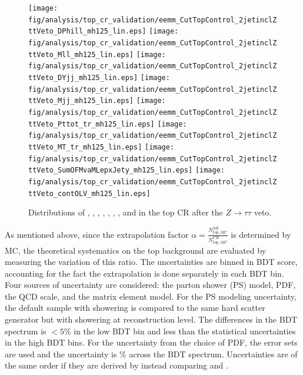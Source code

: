 \begin{figure}[h]
  \centering
  \texttt{[image: fig/analysis/top\_cr\_validation/eemm\_CutTopControl\_2jetinclZttVeto\_DPhill\_mh125\_lin.eps]}
   \texttt{[image: fig/analysis/top\_cr\_validation/eemm\_CutTopControl\_2jetinclZttVeto\_Mll\_mh125\_lin.eps]}
   \texttt{[image: fig/analysis/top\_cr\_validation/eemm\_CutTopControl\_2jetinclZttVeto\_DYjj\_mh125\_lin.eps]}
   \texttt{[image: fig/analysis/top\_cr\_validation/eemm\_CutTopControl\_2jetinclZttVeto\_Mjj\_mh125\_lin.eps]}
   \texttt{[image: fig/analysis/top\_cr\_validation/eemm\_CutTopControl\_2jetinclZttVeto\_Pttot\_tr\_mh125\_lin.eps]}
   \texttt{[image: fig/analysis/top\_cr\_validation/eemm\_CutTopControl\_2jetinclZttVeto\_MT\_tr\_mh125\_lin.eps]}
   \texttt{[image: fig/analysis/top\_cr\_validation/eemm\_CutTopControl\_2jetinclZttVeto\_SumOFMvaMLepxJety\_mh125\_lin.eps]}
   \texttt{[image: fig/analysis/top\_cr\_validation/eemm\_CutTopControl\_2jetinclZttVeto\_contOLV\_mh125\_lin.eps]}
   \caption{Distributions
   of \dphill, \mll, \dyjj, \mjj, \pTtot, \mT, \SumMlj, and \lepEtaCent
   in the \eemm top CR after the $Z\rightarrow{\tau\tau}$ veto.}
  \label{chap:analysis:fig:bdt_inputs_topcr_sf}
\end{figure}

As mentioned above, since the extrapolation factor $\alpha
= \frac{N_{top,MC}^{SR}}{N_{top,MC}^{CR}}$ is determined by MC, the
theoretical systematics on the top background are evaluated by
measuring the variation of this ratio. The uncertainties are binned in
BDT score, accounting for the fact the extrapolation is done
separately in each BDT bin. Four sources of uncertainty
are considered: the parton shower (PS) model, PDF, the QCD scale, and
the matrix element model. For the PS modeling uncertainty, the default
sample with \PYTHIA showering is compared to the same hard scatter
generator but with \HERWIG showering at reconstruction
level. The differences in the BDT spectrum is $<5\%$ in the low BDT
bin and less than the statistical uncertainties in the high BDT
bins. For the uncertainty from the choice of PDF, the \ctten error sets
are used and the uncertainty is \% across the BDT
spectrum. Uncertainties are of the same order if they are derived by
instead comparing \ctten and \nnpdf. 

